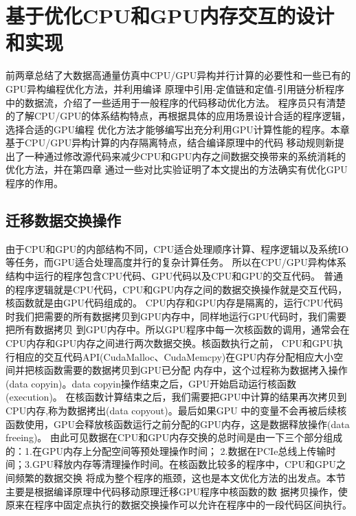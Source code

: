 \chapter{基于优化CPU和GPU内存交互的设计和实现}
前两章总结了大数据高通量仿真中CPU/GPU异构并行计算的必要性和一些已有的GPU异构编程优化方法，并利用编译
原理中引用-定值链和定值-引用链分析程序中的数据流，介绍了一些适用于一般程序的代码移动优化方法。
程序员只有清楚的了解CPU/GPU的体系结构特点，再根据具体的应用场景设计合适的程序逻辑，选择合适的GPU编程
优化方法才能够编写出充分利用GPU计算性能的程序。本章基于CPU/GPU异构计算的内存隔离特点，结合编译原理中的代码
移动规则新提出了一种通过修改源代码来减少CPU和GPU内存之间数据交换带来的系统消耗的优化方法，并在第四章
通过一些对比实验证明了本文提出的方法确实有优化GPU程序的作用。
\section{迁移数据交换操作}
由于CPU和GPU的内部结构不同，CPU适合处理顺序计算、程序逻辑以及系统IO等任务，而GPU适合处理高度并行的复杂计算任务。
所以在CPU/GPU异构体系结构中运行的程序包含CPU代码、GPU代码以及CPU和GPU的交互代码。
普通的程序逻辑就是CPU代码，CPU和GPU内存之间的数据交换操作就是交互代码，核函数就是由GPU代码组成的。
CPU内存和GPU内存是隔离的，运行CPU代码时我们把需要的所有数据拷贝到GPU内存中，同样地运行GPU代码时，我们需要把所有数据拷贝
到GPU内存中。所以GPU程序中每一次核函数的调用，通常会在CPU内存和GPU内存之间进行两次数据交换。核函数执行之前，
CPU和GPU执行相应的交互代码API(CudaMalloc、CudaMemcpy)在GPU内存分配相应大小空间并把核函数需要的数据拷贝到GPU已分配
内存中，这个过程称为数据拷入操作(data copyin)。data copyin操作结束之后，GPU开始启动运行核函数(execution)。
在核函数计算结束之后，我们需要把GPU中计算的结果再次拷贝到CPU内存,称为数据拷出(data copyout)。最后如果GPU
中的变量不会再被后续核函数使用，GPU会释放核函数运行之前分配的GPU内存，这是数据释放操作(data freeing)。
由此可见数据在CPU和GPU内存交换的总时间是由一下三个部分组成的：1.在GPU内存上分配空间等预处理操作时间；
2.数据在PCIe总线上传输时间；3.GPU释放内存等清理操作时间。在核函数比较多的程序中，CPU和GPU之间频繁的数据交换
将成为整个程序的瓶颈，这也是本文优化方法的出发点。本节主要是根据编译原理中代码移动原理迁移GPU程序中核函数的数
据拷贝操作，使原来在程序中固定点执行的数据交换操作可以允许在程序中的一段代码区间执行。

